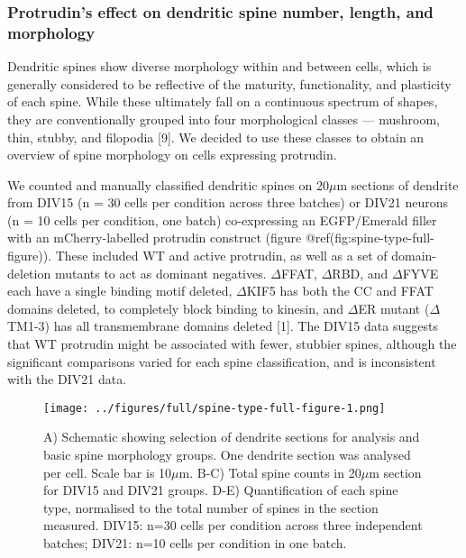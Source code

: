 \documentclass[
  12pt,
  a4paper,
]{article}
\begin{document}
\hypertarget{protrudins-effect-on-dendritic-spine-number-length-and-morphology}{%
\subsubsection{Protrudin's effect on dendritic spine number, length, and
morphology}\label{protrudins-effect-on-dendritic-spine-number-length-and-morphology}}

Dendritic spines show diverse morphology within and between cells, which
is generally considered to be reflective of the maturity, functionality,
and plasticity of each spine. While these ultimately fall on a
continuous spectrum of shapes, they are conventionally grouped into four
morphological classes --- mushroom, thin, stubby, and filopodia {[}9{]}.
We decided to use these classes to obtain an overview of spine
morphology on cells expressing protrudin.

We counted and manually classified dendritic spines on 20\(\mu\)m
sections of dendrite from DIV15 (n = 30 cells per condition across three
batches) or DIV21 neurons (n = 10 cells per condition, one batch)
co-expressing an EGFP/Emerald filler with an mCherry-labelled protrudin
construct (figure @ref(fig:spine-type-full-figure)). These included WT
and active protrudin, as well as a set of domain-deletion mutants to act
as dominant negatives. \(\Delta\)FFAT, \(\Delta\)RBD, and \(\Delta\)FYVE
each have a single binding motif deleted, \(\Delta\)KIF5 has both the CC
and FFAT domains deleted, to completely block binding to kinesin, and
\(\Delta\)ER mutant (\(\Delta\)TM1-3) has all transmembrane domains
deleted {[}1{]}. The DIV15 data suggests that WT protrudin might be
associated with fewer, stubbier spines, although the significant
comparisons varied for each spine classification, and is inconsistent
with the DIV21 data.

\begin{figure}
\centering
\texttt{[image: ../figures/full/spine-type-full-figure-1.png]}
\caption{A) Schematic showing selection of dendrite sections for
analysis and basic spine morphology groups. One dendrite section was
analysed per cell. Scale bar is 10\(\mu\)m. B-C) Total spine counts in
20\(\mu\)m section for DIV15 and DIV21 groups. D-E) Quantification of
each spine type, normalised to the total number of spines in the section
measured. DIV15: n=30 cells per condition across three independent
batches; DIV21: n=10 cells per condition in one batch.}
\end{figure}
\end{document}
